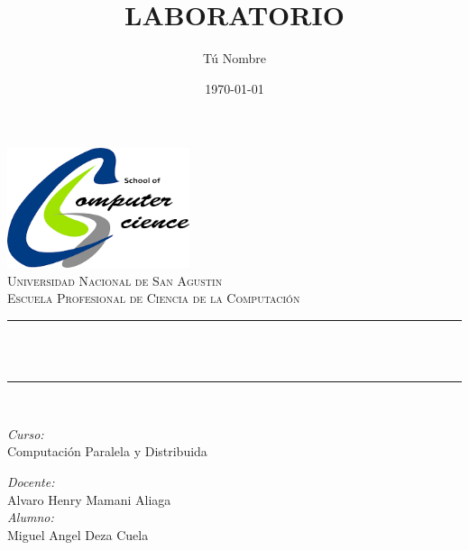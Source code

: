 \documentclass{article}
\title{LABORATORIO}
\author{Tú Nombre}
\date{\today}
\begin{document}
    \begin{center}
        \includegraphics[width=0.4\textwidth]{logos/cs.png}\\[1cm]

        \textsc{\LARGE Universidad Nacional de San Agustin}\\[1.0cm]
        \textsc{\Large Escuela Profesional de Ciencia de la Computación}\\[1.5cm]

        \rule{\linewidth}{0.5mm}\\[0.4cm]
        {\huge\bfseries \thetitle}\\
        \rule{\linewidth}{0.5mm}\\[1.5cm]

        \begin{minipage}{0.4\textwidth}
            \begin{flushleft}
                \large
                \emph{Curso:}\\
                Computación Paralela y Distribuida
            \end{flushleft}
        \end{minipage}
        \begin{minipage}{0.4\textwidth}
            \begin{flushright}
                \large
                \emph{Docente:}\\
                Alvaro Henry Mamani Aliaga\\[0.5cm]
                \emph{Alumno:}\\
                Miguel Angel Deza Cuela\\[0.5cm]
                
            \end{flushright}
        \end{minipage}

        \vfill %

        {\large \thedate}

    \end{center}
    
\newpage

\end{document}
